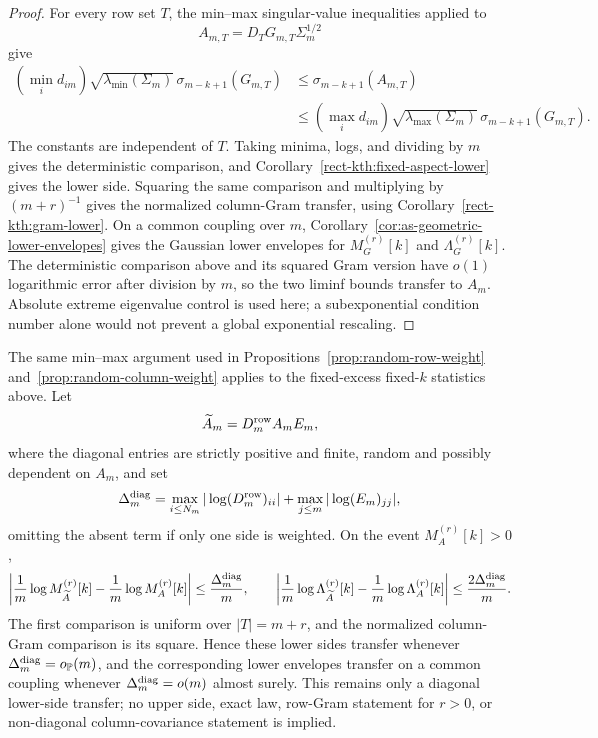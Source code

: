 \begin{proof}
For every row set \(T\), the min--max singular-value inequalities applied to
\[
  A_{m,T}=D_TG_{m,T}\Sigma_m^{1/2}
\]
give
\[
\begin{aligned}
  \left(\min_i d_{im}\right)\sqrt{\lambda_{\min}(\Sigma_m)}\,
  \sigma_{m-k+1}(G_{m,T})
  &\le \sigma_{m-k+1}(A_{m,T})\\
  &\le
  \left(\max_i d_{im}\right)\sqrt{\lambda_{\max}(\Sigma_m)}\,
  \sigma_{m-k+1}(G_{m,T}).
\end{aligned}
\]
The constants are independent of \(T\).  Taking minima, logs, and dividing by
\(m\) gives the deterministic comparison, and
Corollary~\ref{rect-kth:fixed-aspect-lower} gives the lower side.  Squaring the
same comparison and multiplying by \((m+r)^{-1}\) gives the normalized
column-Gram transfer, using Corollary~\ref{rect-kth:gram-lower}.  On a common
coupling over \(m\), Corollary~\ref{cor:as-geometric-lower-envelopes} gives the
Gaussian lower envelopes for \(M_G^{(r)}[k]\) and \(\Lambda_G^{(r)}[k]\).  The
deterministic comparison above and its squared Gram version have \(o(1)\)
logarithmic error after division by \(m\), so the two liminf bounds transfer to
\(A_m\).  Absolute extreme eigenvalue control is used here; a subexponential
condition number alone would not prevent a global exponential rescaling.
\end{proof}

\begin{remark}\label{rem:random-diagonal-fixed-k}
The same min--max argument used in
Propositions~\ref{prop:random-row-weight} and~\ref{prop:random-column-weight}
applies to the fixed-excess fixed-\(k\) statistics above.  Let
\[
  \widetilde A_m=D_m^{\rm row}A_mE_m,
\]
where the diagonal entries are strictly positive and finite, random and
possibly dependent on \(A_m\), and set
\[
  \Delta_m^{\rm diag}
  =
  \max_{i\le N_m}|\log (D_m^{\rm row})_{ii}|
  +
  \max_{j\le m}|\log (E_m)_{jj}|,
\]
omitting the absent term if only one side is weighted.  On the event
\(M_A^{(r)}[k]>0\),
\[
  \left|
  \frac1m\log M_{\widetilde A}^{(r)}[k]
  -\frac1m\log M_A^{(r)}[k]\right|
  \le \frac{\Delta_m^{\rm diag}}{m},
  \qquad
  \left|
  \frac1m\log \Lambda_{\widetilde A}^{(r)}[k]
  -\frac1m\log \Lambda_A^{(r)}[k]\right|
  \le \frac{2\Delta_m^{\rm diag}}{m}.
\]
The first comparison is uniform over \(|T|=m+r\), and the normalized
column-Gram comparison is its square.  Hence these lower sides transfer
whenever \(\Delta_m^{\rm diag}=o_{\mathbb{P}}(m)\), and the corresponding lower
envelopes transfer on a common coupling whenever
\(\Delta_m^{\rm diag}=o(m)\) almost surely.  This remains only a diagonal
lower-side transfer; no upper side, exact law, row-Gram statement for \(r>0\),
or non-diagonal column-covariance statement is implied.
\end{remark}


